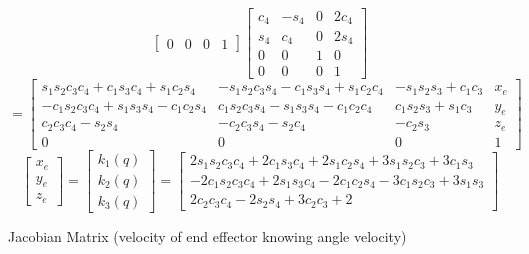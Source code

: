 \documentclass{article}
\begin{document}
{\[\begin{bmatrix}
0 & 0 & 0 & 1
\end{bmatrix}
\begin{bmatrix}
c_{4} & - s_{4} & 0 & 2c_{4} \\
s_{4} & c_{4} & 0 & 2s_{4} \\
0 & 0 & 1 & 0 \\
0 & 0 & 0 & 1
\end{bmatrix}
\]
\[
=
\begin{bmatrix}
s_{1}s_{2}c_{3}c_{4} + c_{1}s_{3}c_{4} + s_{1}c_{2}s_{4} &
-s_{1}s_{2}c_{3}s_{4} -c_{1}s_{3}s_{4} + s_{1}c_{2}c_{4} &
-s_{1}s_{2}s_{3} + c_{1}c_{3} &
x_{e} \\
-c_{1}s_{2}c_{3}c_{4} + s_{1}s_{3}s_{4} - c_{1}c_{2}s_{4} &
c_{1}s_{2}c_{3}s_{4} -s_{1}s_{3}s_{4} - c_{1}c_{2}c_{4} &
c_{1}s_{2}s_{3} + s_{1}c_{3} &
y_{e} \\
c_{2}c_{3}c_{4} -s_{2}s_{4} &
-c_{2}c_{3}s_{4} -s_{2}c_{4} &
-c_{2}s_{3}
& z_{e} \\
0 & 
0 & 
0 & 
1
\end{bmatrix}
\]
\[
\begin{bmatrix}
x_{e} \\
y_{e} \\
z_{e}
\end{bmatrix}
=
\begin{bmatrix}
k_{1}(q) \\
k_{2}(q) \\
k_{3}(q)
\end{bmatrix}
=
\begin{bmatrix}
2s_{1}s_{2}c_{3}c_{4} + 2c_{1}s_{3}c_{4} + 2s_{1}c_{2}s_{4} +3s_{1}s_{2}c_{3} + 3c_{1}s_{3} \\
-2c_{1}s_{2}c_{3}c_{4} + 2s_{1}s_{3}c_{4} - 2c_{1}c_{2}s_{4} -3c_{1}s_{2}c_{3} + 3s_{1}s_{3} \\
2c_{2}c_{3}c_{4} -2s_{2}s_{4} + 3c_{2}c_{3}+2
\end{bmatrix}
\]
}
\newpage

\begin{center}
	{\Large Jacobian Matrix (velocity of end effector knowing angle velocity)}
\end{center}
\end{document}
